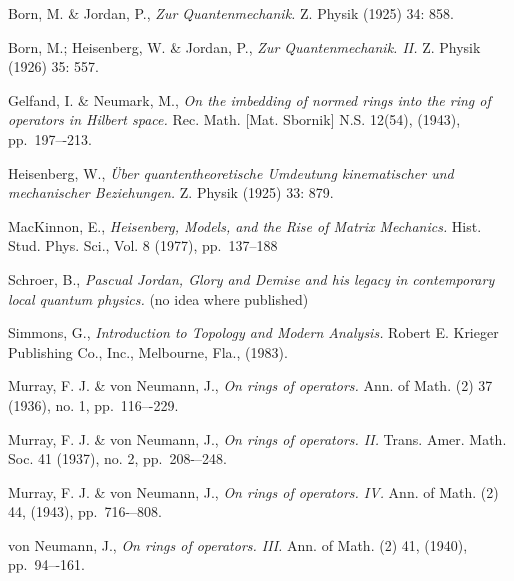 \documentclass[12pt,a4paper]{amsart}
\theoremstyle{plain}
\theoremstyle{definition}
\begin{document}
\begin{thebibliography}{00}
	

	Born, M. \& Jordan, P.,
	\emph{Zur Quantenmechanik.}
	Z. Physik (1925) 34: 858.
	
	Born, M.; Heisenberg, W. \& Jordan, P.,
	\emph{Zur Quantenmechanik. II.}
	Z. Physik (1926) 35: 557.






	Gelfand, I. \& Neumark, M.,
	\emph{On the imbedding of normed rings into the ring of operators in Hilbert space.}
	Rec. Math. [Mat. Sbornik] N.S. 12(54), (1943), pp.~197–-213.

	Heisenberg, W.,
	\emph{{\"U}ber quantentheoretische Umdeutung kinematischer und mechanischer Beziehungen.}
	Z. Physik (1925) 33: 879. 
	




	MacKinnon, E.,
	\emph{Heisenberg, Models, and the Rise of Matrix Mechanics.}
	Hist. Stud. Phys. Sci., Vol. 8 (1977), pp.~137--188


	Schroer, B.,
	\emph{Pascual Jordan, Glory and Demise and his legacy in contemporary local quantum physics.}
	(no idea where published)
	
	Simmons, G.,
	\emph{Introduction to Topology and Modern Analysis.}
	Robert E. Krieger Publishing Co., Inc., Melbourne, Fla., (1983).
	
	Murray, F. J. \& von Neumann, J.,
	\emph{On rings of operators.}
	Ann. of Math. (2) 37 (1936), no. 1, pp.~116–-229.

	Murray, F. J. \& von Neumann, J.,
	\emph{On rings of operators. II.}
	Trans. Amer. Math. Soc. 41 (1937), no. 2, pp.~208-–248. 

	Murray, F. J. \& von Neumann, J.,
	\emph{On rings of operators. IV.}
	Ann. of Math. (2) 44, (1943), pp.~716-–808.

	von Neumann, J.,
	\emph{On rings of operators. III.}
	Ann. of Math. (2) 41, (1940), pp.~94–-161.

	
\end{thebibliography}
\end{document}
